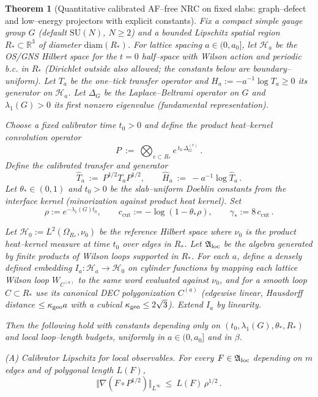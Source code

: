 \documentclass[11pt]{amsart}
\theoremstyle{plain}
\newtheorem{theorem}{Theorem}[section]
\theoremstyle{definition}
\theoremstyle{remark}
\begin{document}
\begin{theorem}[Quantitative calibrated AF--free NRC on fixed slabs: graph--defect and low--energy projectors with explicit constants]\label{thm:quant-calibrated-af-free-nrc}
Fix a compact simple gauge group $G$ (default $\mathrm{SU}(N)$, $N\ge 2$) and a bounded Lipschitz spatial region $R_*\subset\mathbb R^3$ of diameter $\mathrm{diam}(R_*)$. For lattice spacing $a\in(0,a_0]$, let $\mathcal H_a$ be the OS/GNS Hilbert space for the $t=0$ half--space with Wilson action and periodic b.c. in $R_*$ (Dirichlet outside also allowed; the constants below are boundary--uniform). Let $T_a$ be the one--tick transfer operator and $H_a:=-a^{-1}\log T_a\ge 0$ its generator on $\mathcal H_a$. Let $\Delta_{G}$ be the Laplace--Beltrami operator on $G$ and $\lambda_1(G)>0$ its first nonzero eigenvalue (fundamental representation).

Choose a fixed calibrator time $t_0>0$ and define the product heat--kernel convolution operator
\[
  P\ :=\ \bigotimes_{e\subset R_*} e^{\,t_0\, \Delta^{(e)}_{G}}\,.
\]
Define the calibrated transfer and generator
\[
  \widehat T_a\ :=\ P^{1/2} T_a P^{1/2},\qquad \widehat H_a\ :=\ -a^{-1}\log \widehat T_a\,.
\]
Let $\theta_*\in(0,1)$ and $t_0>0$ be the slab--uniform Doeblin constants from the interface kernel (minorization against product heat kernel). Set
\[
  \rho:=e^{-\lambda_1(G) t_0},\qquad c_{\mathrm{cut}}:=-\log(1-\theta_*\rho),\qquad \gamma_*:=8\,c_{\mathrm{cut}}\,.
\]

Let $\mathcal H_0:=L^2(\Omega_{R_*},\nu_0)$ be the reference Hilbert space where $\nu_0$ is the product heat--kernel measure at time $t_0$ over edges in $R_*$. Let $\mathfrak A_{\rm loc}$ be the algebra generated by finite products of Wilson loops supported in $R_*$. For each $a$, define a densely defined embedding $I_a:\mathcal H_a\to\mathcal H_0$ on cylinder functions by mapping each lattice Wilson loop $W_{C^{(a)}}$ to the same word evaluated against $\nu_0$, and for a smooth loop $C\subset R_*$ use its canonical DEC polygonization $C^{(a)}$ (edgewise linear, Hausdorff distance $\le \kappa_{\rm geo} a$ with a cubical $\kappa_{\rm geo}\le 2\sqrt{3}$). Extend $I_a$ by linearity.

Then the following hold with constants depending only on $(t_0,\lambda_1(G),\theta_*,R_*)$ and local loop--length budgets, uniformly in $a\in(0,a_0]$ and in $\beta$.

\emph{(A) Calibrator Lipschitz for local observables.} For every $F\in\mathfrak A_{\rm loc}$ depending on $m$ edges and of polygonal length $L(F)$,
\[
  \Vert \nabla(F\circ P^{1/2})\Vert_{L^\infty}\ \le\ L(F)\,\rho^{1/2}\,.
\]


\end{theorem}
\end{document}
